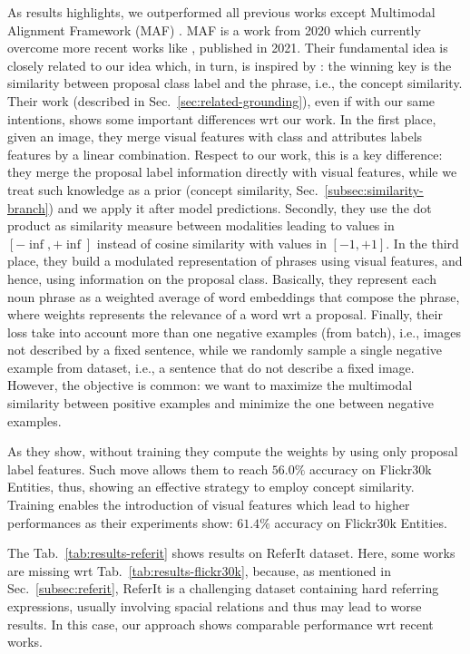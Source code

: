 As results highlights, we outperformed all previous works except
Multimodal Alignment Framework (MAF) \cite{wang2020maf}. MAF is a work
from 2020 which currently overcome more recent works like
\cite{arbelle2021detector}, published in 2021. Their fundamental idea
is closely related to our idea which, in turn, is inspired by
\cite{wang2019phrase}: the winning key is the similarity between
proposal class label and the phrase, i.e., the concept similarity.
Their work (described in Sec.~\ref{sec:related-grounding}), even if
with our same intentions, shows some important differences wrt our
work. In the first place, given an image, they merge visual features
with class and attributes labels features by a linear combination.
Respect to our work, this is a key difference: they merge the proposal
label information directly with visual features, while we treat such
knowledge as a prior (concept similarity,
Sec.~\ref{subsec:similarity-branch}) and we apply it after model
predictions. Secondly, they use the dot product as similarity measure
between modalities leading to values in $[-\inf, +\inf]$ instead of
cosine similarity with values in $[-1, +1]$. In the third place, they
build a modulated representation of phrases using visual features, and
hence, using information on the proposal class. Basically, they
represent each noun phrase as a weighted average of word embeddings
that compose the phrase, where weights represents the relevance of a
word wrt a proposal. Finally, their loss take into account more than
one negative examples (from batch), i.e., images not described by a
fixed sentence, while we randomly sample a single negative example
from dataset, i.e., a sentence that do not describe a fixed image.
However, the objective is common: we want to maximize the multimodal
similarity between positive examples and minimize the one between
negative examples.  

As they show, without training they compute the weights by using only
proposal label features. Such move allows them to reach $56.0\%$
accuracy on Flickr30k Entities, thus, showing an effective strategy to
employ concept similarity. Training enables the introduction of visual
features which lead to higher performances as their experiments show:
$61.4\%$ accuracy on Flickr30k Entities.

The Tab.~\ref{tab:results-referit} shows results on ReferIt dataset.
Here, some works are missing wrt Tab.~\ref{tab:results-flickr30k},
because, as mentioned in Sec.~\ref{subsec:referit}, ReferIt is a
challenging dataset containing hard referring expressions, usually
involving spacial relations and thus may lead to worse results. In
this case, our approach shows comparable performance wrt recent works.

